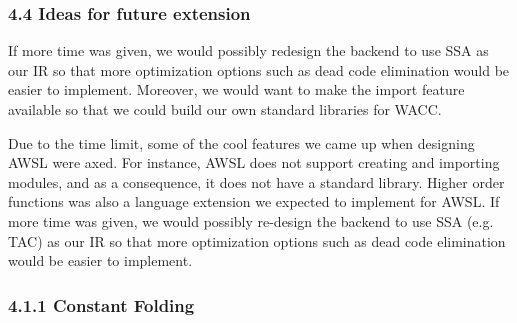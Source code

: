 \documentclass[10pt,a4paper]{report}
\newenvironment{tabularverbatim}
 {\VerbatimEnvironment
  \begin{BVerbatim}[baseline=c,formatcom=\setlength{\baselineskip}{\normalbaselineskip}]}
 {\end{BVerbatim}}
\begin{document}
  \subsubsection*{4.4 Ideas for future extension}
  If more time was given, we would possibly redesign the backend to use SSA as
  our IR so that more optimization options such as dead code elimination would
  be easier to implement. Moreover, we would want to make the import feature
  available so that we could build our own standard libraries for WACC.

  Due to the time limit, some of the cool features we came up when designing
  AWSL were axed. For instance, AWSL does not support creating and importing
  modules, and as a consequence, it does not have a standard library. Higher
  order functions was also a language extension we expected to implement for
  AWSL. If more time was given, we would possibly re-design the backend to use
  SSA (e.g. TAC) as our IR so that more optimization options such as dead code
  elimination would be easier to implement.
  


  \appendixpage

  \subsubsection*{4.1.1 Constant Folding}
  \begin{center}
  \end{center}
\end{document}
